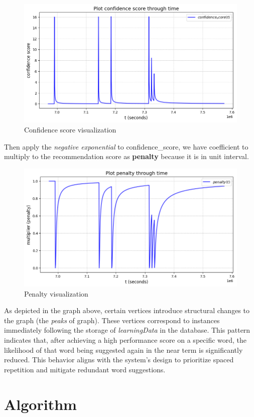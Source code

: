 \documentclass{article}
\begin{document}
\begin{figure}[H]
    \centering
    \includegraphics[width=0.75\linewidth]{confidence-score.png}
    \caption{Confidence score visualization}
    \label{fig:confidence-score}
\end{figure}

Then apply the \textit{negative exponential} to confidence\_score, we have coefficient to multiply to the recommendation score as \textbf{penalty} because it is in unit interval.

\begin{figure}[H]
    \centering
    \includegraphics[width=0.75\linewidth]{penalty-multiplier.png}
    \caption{Penalty visualization}
    \label{fig:penalty-score}
\end{figure}

As depicted in the graph above, certain vertices introduce structural changes to the graph (the \textit{peaks} of graph). These vertices correspond to instances immediately following the storage of \textit{learningData} in the database. This pattern indicates that, after achieving a high performance score on a specific word, the likelihood of that word being suggested again in the near term is significantly reduced. This behavior aligns with the system's design to prioritize spaced repetition and mitigate redundant word suggestions.




\section{Algorithm} 
\end{document}
